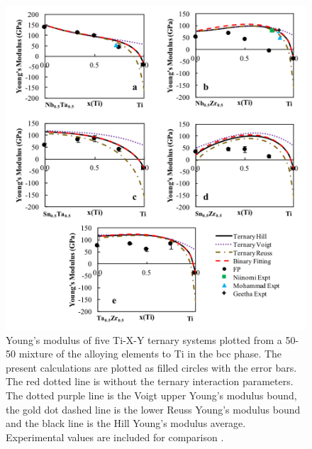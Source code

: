 \pagebreak
\begin{figure}[H]
	\centering
	\includegraphics[width=\textwidth]{Chapter-6/Figures/tixyyoungs2.png}
	\caption{Young's modulus of five Ti-X-Y ternary systems plotted from a 50-50 mixture of the alloying elements to Ti in the bcc phase. The present calculations are plotted as filled circles with the error bars. The red dotted line is without the ternary interaction parameters. The dotted purple line is the Voigt upper Young's modulus bound, the gold dot dashed line is the lower Reuss Young's modulus bound and the black line is the Hill Young's modulus average. Experimental values are included for comparison \cite{Niinomi2012,Mohammed2014,Nozoe2007,Geetha2009}.}
	\label{Ch6-figure:tixyyoungs2}
\end{figure}

